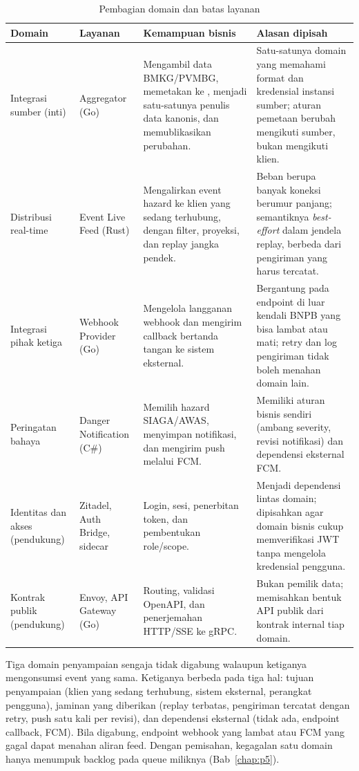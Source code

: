 \begin{table}[H]
    \centering
    \small
    \caption{Pembagian domain dan batas layanan}
    \begin{tabularx}{\textwidth}{@{}P{0.20\textwidth}P{0.17\textwidth}X X@{}}
        \toprule
        \textbf{Domain} & \textbf{Layanan} & \textbf{Kemampuan bisnis} & \textbf{Alasan dipisah} \\
        \midrule
        Integrasi sumber (inti) & Aggregator (Go) & Mengambil data BMKG/PVMBG, memetakan ke , menjadi satu-satunya penulis data kanonis, dan memublikasikan perubahan. & Satu-satunya domain yang memahami format dan kredensial instansi sumber; aturan pemetaan berubah mengikuti sumber, bukan mengikuti klien. \\
        Distribusi real-time & Event Live Feed (Rust) & Mengalirkan event hazard ke klien yang sedang terhubung, dengan filter, proyeksi, dan replay jangka pendek. & Beban berupa banyak koneksi berumur panjang; semantiknya \emph{best-effort} dalam jendela replay, berbeda dari pengiriman yang harus tercatat. \\
        Integrasi pihak ketiga & Webhook Provider (Go) & Mengelola langganan webhook dan mengirim callback bertanda tangan ke sistem eksternal. & Bergantung pada endpoint di luar kendali BNPB yang bisa lambat atau mati; retry dan log pengiriman tidak boleh menahan domain lain. \\
        Peringatan bahaya & Danger Notification (C\#) & Memilih hazard SIAGA/AWAS, menyimpan notifikasi, dan mengirim push melalui FCM. & Memiliki aturan bisnis sendiri (ambang severity, revisi notifikasi) dan dependensi eksternal FCM. \\
        Identitas dan akses (pendukung) & Zitadel, Auth Bridge, sidecar & Login, sesi, penerbitan token, dan pembentukan role/scope. & Menjadi dependensi lintas domain; dipisahkan agar domain bisnis cukup memverifikasi JWT tanpa mengelola kredensial pengguna. \\
        Kontrak publik (pendukung) & Envoy, API Gateway (Go) & Routing, validasi OpenAPI, dan penerjemahan HTTP/SSE ke gRPC. & Bukan pemilik data; memisahkan bentuk API publik dari kontrak internal tiap domain. \\
        \bottomrule
    \end{tabularx}
\end{table}

Tiga domain penyampaian sengaja tidak digabung walaupun ketiganya
mengonsumsi event yang sama. Ketiganya berbeda pada tiga hal: tujuan
penyampaian (klien yang sedang terhubung, sistem eksternal, perangkat
pengguna), jaminan yang diberikan (replay terbatas, pengiriman tercatat dengan
retry, push satu kali per revisi), dan dependensi eksternal (tidak ada,
endpoint callback, FCM). Bila digabung, endpoint webhook yang lambat atau FCM
yang gagal dapat menahan aliran feed. Dengan pemisahan, kegagalan satu
domain hanya menumpuk backlog pada queue miliknya (Bab~\ref{chap:p5}).

